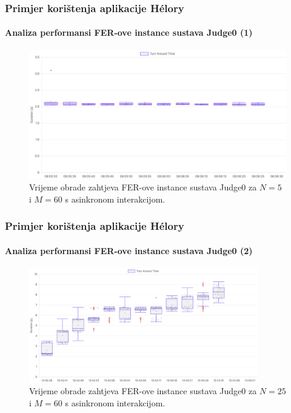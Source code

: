 \documentclass{beamer}
\newif\ifplacelogo
\begin{document}
\placelogofalse
\begin{frame}
\frametitle{Primjer korištenja aplikacije Hélory}
\framesubtitle{Analiza performansi FER-ove instance sustava Judge0 (1)}
\begin{figure}[htb]
	\centering
	\includegraphics[width=\textwidth]{images/Judge0 FER TAT for 5 5s.png}
	\caption{
		Vrijeme obrade zahtjeva FER-ove instance sustava Judge0 za $N=5$ i $M=60$ s asinkronom interakcijom.
	}
\end{figure}
\end{frame}
\placelogotrue

\placelogofalse
\begin{frame}
\frametitle{Primjer korištenja aplikacije Hélory}
\framesubtitle{Analiza performansi FER-ove instance sustava Judge0 (2)}
\begin{figure}[htb]
	\centering
	\includegraphics[width=0.89\textwidth]{images/Judge0 FER TAT for 25 5s.png}
	\caption{
		Vrijeme obrade zahtjeva FER-ove instance sustava Judge0 za $N=25$ i $M=60$ s asinkronom interakcijom.
	}
\end{figure}
\end{frame}
\placelogotrue
\end{document}
